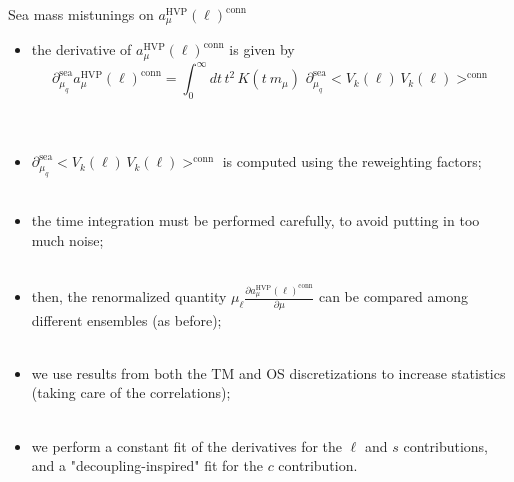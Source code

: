 \documentclass[xcolor={dvipsnames,table}]{beamer}
\begin{document}
\begin{frame}{Sea mass mistunings on $a_\mu^\mathrm{HVP}(\ell)^\mathrm{conn}$}
    \begin{itemize}
        \item the derivative of $a_\mu^\mathrm{HVP}(\ell)^\mathrm{conn}$ is given by
        \[
        \partial^\mathrm{sea}_{\mu_q}a_\mu^\mathrm{HVP}(\ell)^\mathrm{conn} = \int_0^\infty dt \, t^2 \, K(t\ m_\mu) \,\, \partial^\mathrm{sea}_{\mu_q}<V_k(\ell)\, V_k(\ell)>^\mathrm{conn}
        \]
        \\ \
        \item $\partial^\mathrm{sea}_{\mu_q}<V_k(\ell)\, V_k(\ell)>^\mathrm{conn}$ is computed using the reweighting factors;\\ \
        \item the time integration must be performed carefully, to avoid putting in too much noise;\\ \
        \item then, the renormalized quantity $\mu_\ell\frac{\partial a_\mu^\mathrm{HVP}(\ell)^\mathrm{conn}}{\partial \mu}$ can be compared among different ensembles (as before);\\ \
        \item we use results from both the TM and OS discretizations to increase statistics (taking care of the correlations);\\ \
        \item we perform a constant fit of the derivatives for the $\ell$ and $s$ contributions, and a "decoupling-inspired" fit for the $c$ contribution.
    \end{itemize}
\end{frame}
\end{document}
